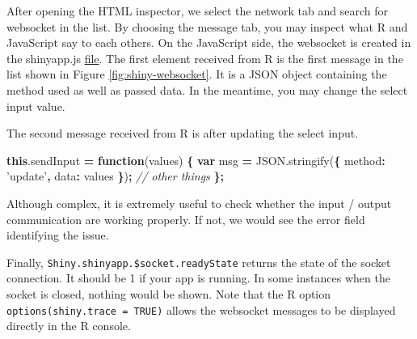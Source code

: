 \documentclass[]{book}
\newenvironment{Shaded}{\begin{snugshade}}{\end{snugshade}}
\newcommand{\AttributeTok}[1]{\textcolor[rgb]{0.77,0.63,0.00}{#1}}
\newcommand{\CommentTok}[1]{\textcolor[rgb]{0.56,0.35,0.01}{\textit{#1}}}
\newcommand{\DataTypeTok}[1]{\textcolor[rgb]{0.13,0.29,0.53}{#1}}
\newcommand{\KeywordTok}[1]{\textcolor[rgb]{0.13,0.29,0.53}{\textbf{#1}}}
\newcommand{\NormalTok}[1]{#1}
\newcommand{\OperatorTok}[1]{\textcolor[rgb]{0.81,0.36,0.00}{\textbf{#1}}}
\newcommand{\StringTok}[1]{\textcolor[rgb]{0.31,0.60,0.02}{#1}}
\newcommand{\VariableTok}[1]{\textcolor[rgb]{0.00,0.00,0.00}{#1}}
\begin{document}
After opening the HTML inspector, we select the network tab and search for websocket in the list. By choosing the message tab, you may inspect what R and JavaScript say to each others. On the JavaScript side, the websocket is created in the shinyapp.js \href{https://github.com/rstudio/shiny/blob/master/srcjs/shinyapp.js}{file}. The first element received from R is the first message in the list shown in Figure \ref{fig:shiny-websocket}. It is a JSON object containing the method used as well as passed data. In the meantime, you may change the select input value.

\begin{Shaded}
\end{Shaded}

The second message received from R is after updating the select input.

\begin{Shaded}
\begin{Highlighting}[]
\KeywordTok{this}\NormalTok{.}\AttributeTok{sendInput} \OperatorTok{=} \KeywordTok{function}\NormalTok{(values) }\OperatorTok{\{}
  \KeywordTok{var}\NormalTok{ msg }\OperatorTok{=} \VariableTok{JSON}\NormalTok{.}\AttributeTok{stringify}\NormalTok{(}\OperatorTok{\{}
    \DataTypeTok{method}\OperatorTok{:} \StringTok{'update'}\OperatorTok{,}
    \DataTypeTok{data}\OperatorTok{:}\NormalTok{ values}
  \OperatorTok{\}}\NormalTok{)}\OperatorTok{;}
\CommentTok{// other things}
\OperatorTok{\};}
\end{Highlighting}
\end{Shaded}

Although complex, it is extremely useful to check whether the input / output communication are working properly. If not, we would see the error field identifying the issue.

Finally, \texttt{Shiny.shinyapp.\$socket.readyState} returns the state of the socket connection. It should be 1 if your app is running. In some instances when the socket is closed, nothing would be shown. Note that the R option \texttt{options(shiny.trace\ =\ TRUE)} allows the websocket messages to be displayed directly in the R console.
\end{document}
